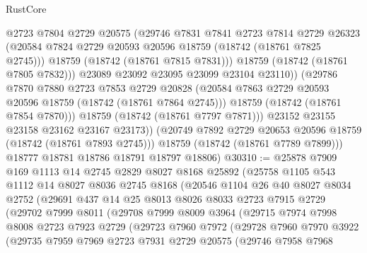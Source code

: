 \begin{lexlean}{RustCore}
\begin{coremodule}
                    @2723
                    @7804
                    @2729
                    @20575
                    (@29746
                      @7831
                      @7841
                      @2723
                      @7814
                      @2729
                      @26323
                      (@20584 @7824 @2729 @20593 @20596 @18759 (@18742 (@18761 @7825 @2745)))
                      @18759
                      (@18742 (@18761 @7815 @7831)))
                    @18759
                    (@18742 (@18761 @7805 @7832)))
                  @23089
                  @23092
                  @23095
                  @23099
                  @23104
                  @23110))
              (@29786
                @7870
                @7880
                @2723
                @7853
                @2729
                @20828
                (@20584 @7863 @2729 @20593 @20596 @18759 (@18742 (@18761 @7864 @2745)))
                @18759
                (@18742 (@18761 @7854 @7870)))
              @18759
              (@18742 (@18761 @7797 @7871)))
            @23152
            @23155
            @23158
            @23162
            @23167
            @23173))
        (@20749 @7892 @2729 @20653 @20596 @18759 (@18742 (@18761 @7893 @2745)))
        @18759
        (@18742 (@18761 @7789 @7899)))
      @18777
      @18781
      @18786
      @18791
      @18797
      @18806)
@30310 := @25878
    @7909
    @169
    @1113
    @14
    @2745
    @2829
    @8027
    @8168
    @25892
    (@25758
      @1105
      @543
      @1112
      @14
      @8027
      @8036
      @2745
      @8168
      (@20546
        @1104
        @26
        @40
        @8027
        @8034
        @2752
        (@29691
          @437
          @14
          @25
          @8013
          @8026
          @8033
          @2723
          @7915
          @2729
          (@29702
            @7999
            @8011
            (@29708
              @7999
              @8009
              @3964
              (@29715
                @7974
                @7998
                @8008
                @2723
                @7923
                @2729
                (@29723
                  @7960
                  @7972
                  (@29728
                    @7960
                    @7970
                    @3922
                    (@29735
                      @7959
                      @7969
                      @2723
                      @7931
                      @2729
                      @20575
                      (@29746
                        @7958
                        @7968

\end{coremodule}
\end{lexlean}
